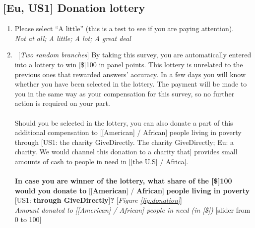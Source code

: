 \subsection*{[Eu, US1] Donation lottery}
\begin{enumerate}[resume] \item Please select ``A little'' (this is a test to see if you are paying attention).
\\ \textit{Not at all; A little; A lot; A great deal}
\item ~[\textit{Two random branches}] \label{q:donation} By taking this survey, you are automatically entered into a lottery to win [\$]100 in panel points. This lottery is unrelated to the previous ones that rewarded answers' accuracy. In a few days you will know whether you have been selected in the lottery. The payment will be made to you in the same way as your compensation for this survey, so no further action is required on your part.\\
\\
Should you be selected in the lottery, you can also donate a part of this additional compensation to [[American] / African] people living in poverty through [US1: the charity GiveDirectly. The charity GiveDirectly; Eu: a charity. We would channel this donation to a charity that] provides small amounts of cash to people in need in [[the U.S] / Africa].\\
\\
\textbf{In case you are winner of the lottery, what share of the [\$]100 would you donate to} [[\textbf{American}] / \textbf{African}] \textbf{people living in poverty} [US1: \textbf{through GiveDirectly}]\textbf{?}  [\textit{Figure \ref{fig:donation}}]
\\ \textit{Amount donated to [[American] / African] people in need (in [\$])} [slider from 0 to 100]
\end{enumerate}

